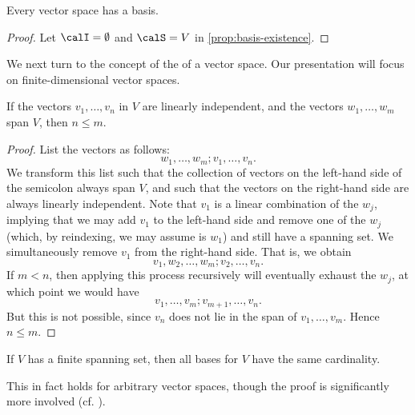 \begin{corollary}
    Every vector space has a basis.
\end{corollary}

\begin{proof}
    Let $\calI = \emptyset$ and $\calS = V$ in \cref{prop:basis-existence}.
\end{proof}


We next turn to the concept of the  of a vector space. Our presentation will focus on finite-dimensional vector spaces.

\begin{proposition}
    If the vectors $v_1, \ldots, v_n$ in $V$ are linearly independent, and the vectors $w_1, \ldots, w_m$ span $V$, then $n \leq m$.
\end{proposition}

\begin{proof}
    List the vectors as follows:
    \begin{equation*}
        w_1, \ldots, w_m; v_1, \ldots, v_n.
    \end{equation*}
    We transform this list such that the collection of vectors on the left-hand side of the semicolon always span $V$, and such that the vectors on the right-hand side are always linearly independent. Note that $v_1$ is a linear combination of the $w_j$, implying that we may add $v_1$ to the left-hand side and remove one of the $w_j$ (which, by reindexing, we may assume is $w_1$) and still have a spanning set. We simultaneously remove $v_1$ from the right-hand side. That is, we obtain
    \begin{equation*}
        v_1, w_2, \ldots, w_m; v_2, \ldots, v_n.
    \end{equation*}
    If $m < n$, then applying this process recursively will eventually exhaust the $w_j$, at which point we would have
    \begin{equation*}
        v_1, \ldots, v_m; v_{m+1}, \ldots, v_n.
    \end{equation*}
    But this is not possible, since $v_n$ does not lie in the span of $v_1, \ldots, v_m$. Hence $n \leq m$.
\end{proof}


\begin{corollarynoproof}
    If $V$ has a finite spanning set, then all bases for $V$ have the same cardinality.
\end{corollarynoproof}
%
This in fact holds for arbitrary vector spaces, though the proof is significantly more involved (cf. \cite[Theorem~1.12]{romanlinalg}).

